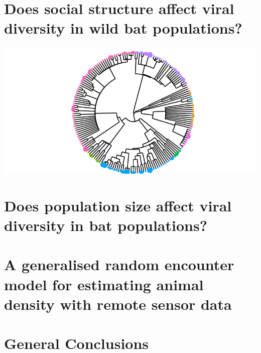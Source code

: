 \documentclass[11pt,phd,a4paper,twoside]{pretty_thesis}
\begin{document}
\chapter[Social structure in wild populations]{Does social structure affect viral diversity in wild bat populations?}
\label{chapterlabel3}
\begin{center}
\includegraphics[width=\textwidth]{figure/treePlot-1.pdf}
\end{center}


\chapter[Population Size]{Does population size affect viral diversity in bat populations?}
\label{chapterlabel4}



\chapter[gREM for estimating animal density]{A generalised random encounter model for estimating animal density with remote sensor data}
\label{chapterlabel5}


\chapter{General Conclusions}
\label{conclusions}




 


%
\printbibliography 


\end{document}
